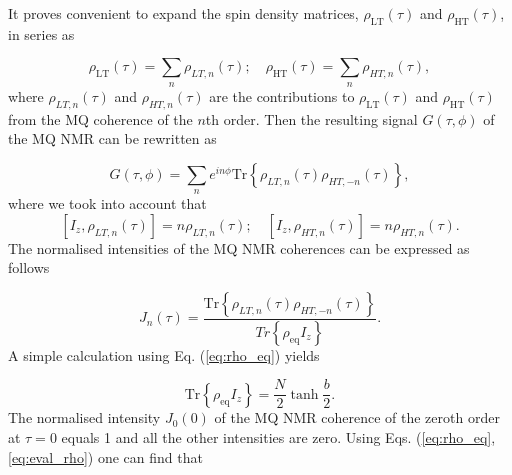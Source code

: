 It proves convenient to expand the spin density matrices, $\rho_\mathrm{LT}(\tau)$ and $\rho_\mathrm{HT}(\tau)$, in series as

\begin{equation}
    \label{eq:rho_series}
    \rho_\mathrm{LT} (\tau) = \sum_n \rho_{LT, n}(\tau); \quad
    \rho_\mathrm{HT} (\tau) = \sum_n \rho_{HT, n}(\tau),
\end{equation}
where $\rho_{LT, n} (\tau)$ and $\rho_{HT, n} (\tau)$ are the contributions to $\rho_\mathrm{LT} (\tau)$ and $\rho_\mathrm{HT} (\tau)$ from the MQ coherence of the $n$th order. Then the resulting signal $G(\tau, \phi)$ of the MQ NMR \cite{mq_nmr_experiment} can be rewritten as 

\begin{equation}
    \label{eq:signal_series}
    G(\tau, \phi) = \sum\limits_n 
    e^{in\phi}\mathrm{Tr} \left\{
    \rho_{LT, n}(\tau) \rho_{HT, -n} (\tau)
    \right\},
\end{equation}
where we took into account that
\begin{equation}
    \left[I_z, \rho_{LT, n} (\tau) \right] = n  \rho_{LT, n} (\tau);
    \quad 
    \left[I_z, \rho_{HT, n} (\tau) \right] = n  \rho_{HT, n} (\tau).
\end{equation}
The normalised intensities of the MQ NMR coherences can be expressed as follows 

\begin{equation}
    \label{eq:coherence}
    J_n(\tau) = 
    \dfrac{
       \mathrm{Tr} \left\{
        \rho_{LT, n}(\tau) \rho_{HT, -n} (\tau)
        \right\}
    }{Tr \left\{\rho_{\mathrm{eq}}I_z\right\}}.
\end{equation}
A simple calculation using Eq.   (\ref{eq:rho_eq}) yields \cite{lab:low_temp_dyn_1997}

\begin{equation}
   \mathrm{Tr} \left\{\rho_{\mathrm{eq}}I_z\right\} = 
    \frac N 2 \tanh \frac b 2.
\end{equation}
The normalised intensity $J_0(0)$ of the MQ NMR coherence of the zeroth order at $\tau=0$ equals 1 and all the other intensities are zero. Using Eqs.   (\ref{eq:rho_eq}, \ref{eq:eval_rho}) one can find that

